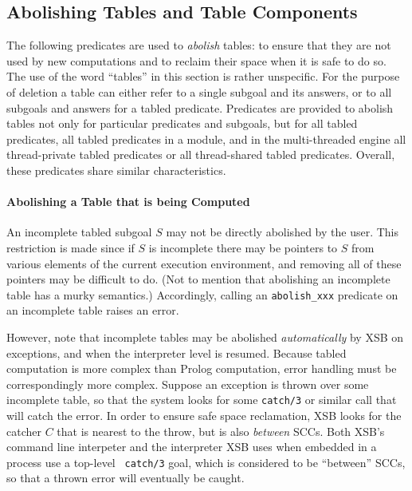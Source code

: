 \begin{description}

\subsection{Abolishing Tables and Table Components}
\label{sec:TablePred:Deleting}

The following predicates are used to {\em abolish} tables: to ensure
that they are not used by new computations and to reclaim their space
when it is safe to do so.  The use of the word ``tables'' in this
section is rather unspecific.  For the purpose of deletion a table can
either refer to a single subgoal and its answers, or to all subgoals
and answers for a tabled predicate.  Predicates are provided to
abolish tables not only for particular predicates and subgoals, but
for all tabled predicates, all tabled predicates in a module, and in
the multi-threaded engine all thread-private tabled predicates or all
thread-shared tabled predicates.  Overall, these predicates share
similar characteristics.

\paragraph{Abolishing a Table that is being Computed}
An incomplete tabled subgoal $S$ may not be directly abolished by the
user.  This restriction is made since if $S$ is incomplete there may
be pointers to $S$ from various elements of the current execution
environment, and removing all of these pointers may be difficult to
do. (Not to mention that abolishing an incomplete table has a murky
semantics.)  Accordingly, calling an {\tt abolish\_xxx} predicate on
an incomplete table raises an error.  

However, note that incomplete tables may be abolished
\emph{automatically} by XSB on exceptions, and when the interpreter
level is resumed.  Because tabled computation is more complex than
Prolog computation, error handling must be correspondingly more
complex.  Suppose an exception is thrown over some incomplete table,
so that the system looks for some {\tt catch/3} or similar call that
will catch the error.  In order to ensure safe space reclamation, XSB
looks for the catcher $C$ that is nearest to the throw, but is also
{\em between} SCCs.  Both XSB's command line interpeter and the
interpreter XSB uses when embedded in a process use a top-level {\tt
  catch/3} goal, which is considered to be ``between'' SCCs, so that a
thrown error will eventually be caught.


\end{description}
